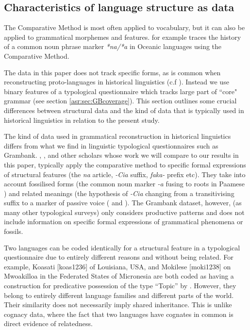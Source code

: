 \documentclass[a4paper,10pt]{article} %
\begin{document}


\subsection{Characteristics of language structure as data}
\label{diff_lexi_str}

The Comparative Method is most often applied to vocabulary, but it can also be applied to grammatical morphemes and features. \citet{crowley1985common} for example traces the history of a common noun phrase marker \emph{*na/*a} in Oceanic languages using the Comparative Method. 

The data in this paper does not track specific forms, as is common when reconstructing proto-languages in historical linguistics (c.f \citet{pawley1973some, crowley1985common, evans2003study}). Instead we use binary features of a typological questionnaire which tracks large part of ``core" grammar (see section \ref{asr:sec:GBcoverage}). This section outlines some crucial differences between structural data and the kind of data that is typically used in historical linguistics in relation to the present study.

The kind of data used in grammatical reconstruction in historical linguistics differs from what we find in linguistic typological questionnaires such as Grambank. \citet{crowley1985common}, \citet{clark1976aspects}, and other scholars whose work we will compare to our results in this paper, typically apply the comparative method to specific formal expressions of structural features (the \emph{na} article, \emph{-Cia} suffix, \emph{faka-} prefix etc). They take into account fossilised forms (the common noun marker \emph{-a} fusing to roots in Paamese \citep[141]{crowley1985common}) and related meanings (the hypothesis of \emph{-Cia} changing from a transitivising suffix to a marker of passive voice (\citet{hale_1968, hohepa_1967, hohepa_1969, chung1978} and \citet{jonsson1998}). The Grambank dataset, however, (as many other typological surveys) only considers productive patterns and does not include information on specific formal expressions of grammatical phenomena or fossils.

Two languages can be coded identically for a structural feature in a typological questionnaire due to entirely different reasons and without being related. For example, Koasati [koas1236] of Louisiana, USA, and Mokilese [moki1238] on Mwoakilloa in the Federated States of Micronesia are both coded as having a construction for predicative possession of the type ``Topic'' by \citet{wals-2011-117}. However, they belong to entirely different language families and different parts of the world. Their similarity does not necessarily imply shared inheritance. This is unlike cognacy data, where the fact that two languages have cognates in common is direct evidence of relatedness.
\end{document}
